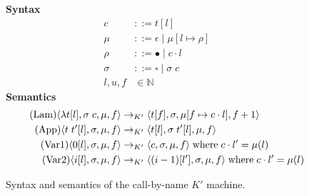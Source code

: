 \begin{figure*}
\textbf{Syntax}
\begin{align*}
\tag{Closure} c &::= t [l] \\
\tag{Heap} \mu &::= \epsilon \; | \; \mu [ l \mapsto \rho ] \\
\tag{Environment} \rho &::= \bullet \; | \; c \cdot l \\
\tag{Context} \sigma &::= \square \; | \; \sigma \; c \\
\tag{Location} l,u,f &\in \mathbb{N}
\end{align*}
\textbf{Semantics}
\begin{align*}
\tag{Lam}
\langle \lambda t[l], \sigma \; c, \mu, f \rangle 
  &\rightarrow_{K'}
\langle t[f], \sigma, \mu[f \mapsto c \cdot l], f+1 \rangle  \\
\tag{App}
\langle t \; t'[l], \sigma, \mu, f \rangle
  &\rightarrow_{K'}
\langle t[l], \sigma \; t'[l], \mu, f \rangle \\
\tag{Var1}
\langle 0[l], \sigma, \mu, f \rangle
  &\rightarrow_{K'}
\langle c, \sigma, \mu, f \rangle 
\; \textnormal{where} \; c \cdot l' = \mu(l)\\
\tag{Var2}
\langle i[l], \sigma, \mu, f \rangle
  &\rightarrow_{K'}
\langle (i-1)[l'], \sigma, \mu, f \rangle
\; \textnormal{where} \; c \cdot l' = \mu(l) \\
\end{align*}
\caption{Syntax and semantics of the call-by-name $K'$ machine.}
\label{fig:K'}
\end{figure*}
